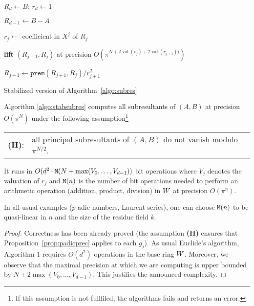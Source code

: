 \documentclass{article}
\DeclareMathOperator{\val}{val}
\begin{document}
\begin{algorithm}

  \BlankLine

  $R_d \leftarrow B$; $r_d \leftarrow 1$

  $R_{d-1} \leftarrow B-A$

    {$r_j \leftarrow$ coefficient in $X^j$ of $R_j$


     \textbf{lift} $(R_{j+1}, R_j)$ at precision $O(\pi^{N+2\val(r_j) + 2\val(r_{j+1}))})$

     $R_{j-1} \leftarrow \texttt{prem}(R_{j+1}, R_j) / r_{j+1}^2$
    }

\caption{Stabilized version of Algorithm~\ref{algo:subres}}
\label{algo:stabsubres}
\end{algorithm}

\begin{prop}
Algorithm \ref{algo:stabsubres} computes all subresultants of
$(A,B)$ at precision $O(\pi^N)$ under the following 
assumption\footnote{If this assumption is not fullfiled, the
algorithms fails and returns an error.}

\medskip

\begin{tabular}{rl}
{\bf (H)}: & all principal subresultants of $(A,B)$ 
do not vanish modulo $\pi^{N/2}$.
\end{tabular}

\medskip

\noindent
It runs in $O(d^2 \cdot \text{\tt M}(N + \text{\rm max}(V_0, \ldots, V_{d-1}))$ bit 
operations where $V_j$ denotes the valuation of $r_j$ and $\text{\tt M}(n)$ is the 
number of bit operations needed to perform an arithmetic operation 
(addition, product, division) in $W$ at precision $O(\pi^n)$.
\end{prop}

\begin{rem}
\label{rem:M}
In all usual examples ($p$-adic numbers, Laurent series), one can 
choose $\text{\tt M}(n)$ to be quasi-linear in $n$ and the size of the residue
field $k$.
\end{rem}

\begin{proof}
Correctness has been already proved (the assumption {\bf (H)} ensures
that Proposition~\ref{prop:padicprec} applies to each $g_j$).
As usual Euclide's algorithm, Algorithm 1 requires $O(d^2)$ operations 
in the base ring $W$. Moreover, we observe that the maximal precision 
at which we are computing is upper bounded by $N + 2 \max(V_0, \ldots, 
V_{d-1})$. This justifies the announced complexity.
\end{proof}
\end{document}
